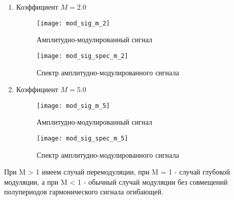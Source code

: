 \begin{enumerate}
\item Коэффициент $ M = 2.0$
\begin{figure}[H]
	\begin{center}
		\texttt{[image: mod\_sig\_m\_2]}
		\caption{Амплитудно-модулированный сигнал } 
		\label{pic:signal_modulated_2_0} %
	\end{center}
\end{figure}
\begin{figure}[H]
	\begin{center}
		\texttt{[image: mod\_sig\_spec\_m\_2]}
		\caption{Спектр амплитудно-модулированного сигнала } 
		\label{pic:mod_sig_spec_2_0} %
	\end{center}
\end{figure}

\item Коэффициент $ M = 5.0$
\begin{figure}[H]
	\begin{center}
		\texttt{[image: mod\_sig\_m\_5]}
		\caption{Амплитудно-модулированный сигнал } 
		\label{pic:signal_modulated_2_0} %
	\end{center}
\end{figure}
\begin{figure}[H]
	\begin{center}
		\texttt{[image: mod\_sig\_spec\_m\_5]}
		\caption{Спектр амплитудно-модулированного сигнала } 
		\label{pic:mod_sig_spec_2_0} %
	\end{center}
\end{figure}
\end{enumerate}

При M > 1 имеем случай перемодуляции, при M = 1 - случай глубокой модуляции, а при M < 1 - обычный случай модуляции без совмещений полупериодов гармонического сигнала огибающей.

